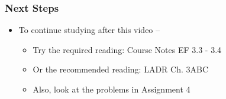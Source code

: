 \documentclass[10pt,english,aspectratio=169]{beamer}
\begin{document}
\begin{frame} \frametitle{Next Steps}

\begin{itemize}
\setlength\itemsep{5mm}
\item To continue studying after this video -- \vspace{2mm}

\begin{itemize}
 \setlength\itemsep{3mm}
 \item Try the required reading: Course Notes EF 3.3 - 3.4
 \item Or the recommended reading: LADR Ch. 3ABC
 \item Also, look at the problems in Assignment 4
\end{itemize}
\end{itemize}


\end{frame}
\end{document}
